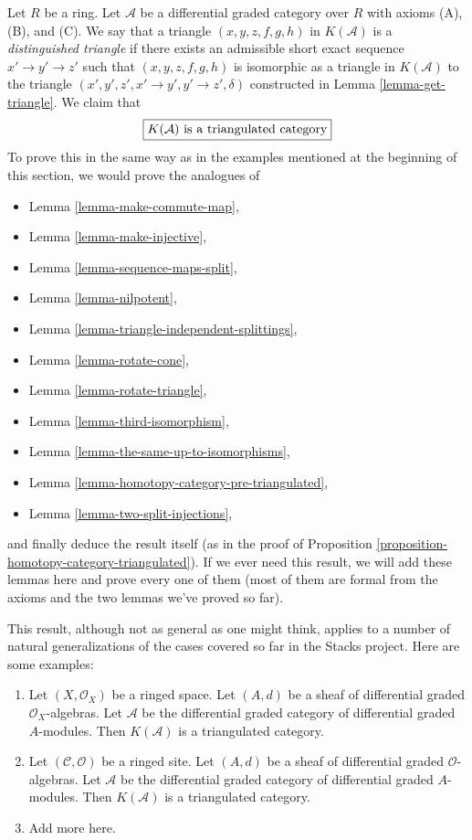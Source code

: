 \noindent
Let $R$ be a ring. Let $\mathcal{A}$ be a differential graded category
over $R$ with axioms (A), (B), and (C). We say that a triangle
$(x, y, z, f, g, h)$ in $K(\mathcal{A})$ is a
{\it distinguished triangle} if there exists an admissible
short exact sequence $x' \to y' \to z'$ such that
$(x, y, z, f, g, h)$ is isomorphic as a triangle in $K(\mathcal{A})$
to the triangle $(x', y', z', x' \to y', y' \to z', \delta)$
constructed in Lemma \ref{lemma-get-triangle}. We claim that
$$
\fbox{$K(\mathcal{A})$ is a triangulated category}
$$
To prove this in the same way as in the examples mentioned at
the beginning of this section, we would prove the analogues of
\begin{itemize}
\item Lemma \ref{lemma-make-commute-map},
\item Lemma \ref{lemma-make-injective}, 
\item Lemma \ref{lemma-sequence-maps-split},
\item Lemma \ref{lemma-nilpotent},
\item Lemma \ref{lemma-triangle-independent-splittings},
\item Lemma \ref{lemma-rotate-cone},
\item Lemma \ref{lemma-rotate-triangle},
\item Lemma \ref{lemma-third-isomorphism},
\item Lemma \ref{lemma-the-same-up-to-isomorphisms},
\item Lemma \ref{lemma-homotopy-category-pre-triangulated},
\item Lemma \ref{lemma-two-split-injections},
\end{itemize}
and finally deduce the result itself (as in the proof of
Proposition \ref{proposition-homotopy-category-triangulated}).
If we ever need this result, we will add these lemmas here
and prove every one of them (most of them are formal from
the axioms and the two lemmas we've proved so far).

\medskip\noindent
This result, although not as general as one might think, applies to a
number of natural generalizations of the cases covered so far in the
Stacks project. Here are some examples:
\begin{enumerate}
\item Let $(X, \mathcal{O}_X)$ be a ringed space. Let $(A, d)$ be a
sheaf of differential graded $\mathcal{O}_X$-algebras. Let
$\mathcal{A}$ be the differential graded category of differential
graded $A$-modules. Then $K(\mathcal{A})$ is a triangulated category.
\item Let $(\mathcal{C}, \mathcal{O})$ be a ringed site. Let $(A, d)$ be a
sheaf of differential graded $\mathcal{O}$-algebras. Let
$\mathcal{A}$ be the differential graded category of differential
graded $A$-modules. Then $K(\mathcal{A})$ is a triangulated category.
\item Add more here.
\end{enumerate}









